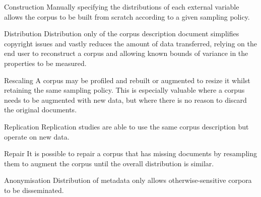 \begin{itemizeTitle}
    \item[Construction] Manually specifying the distributions of each external variable allows the corpus to be built from scratch according to a given sampling policy.

    \item[Distribution] Distribution only of the corpus description document simplifies copyright issues and vastly reduces the amount of data transferred, relying on the end user to reconstruct a corpus and allowing known bounds of variance in the properties to be measured.

    \item[Rescaling] A corpus may be profiled and rebuilt or augmented to resize it whilst retaining the same sampling policy.  This is especially valuable where a corpus needs to be augmented with new data, but where there is no reason to discard the original documents.

    \item[Replication] Replication studies are able to use the same corpus description but operate on new data.

    \item[Repair] It is possible to repair a corpus that has missing documents by resampling them to augment the corpus until the overall distribution is similar.

    \item[Anonymisation] Distribution of metadata only allows otherwise-sensitive corpora to be disseminated.
\end{itemizeTitle}




